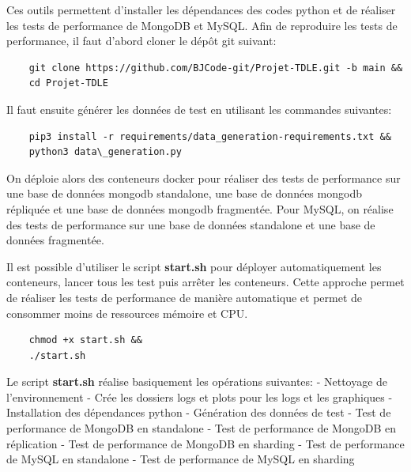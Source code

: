 \documentclass[12pt,a4paper]{report}
\begin{document}
Ces outils permettent d'installer les dépendances des codes python et de
réaliser les tests de performance de MongoDB et MySQL. Afin de
reproduire les tests de performance, il faut d'abord cloner le dépôt git
suivant:

\begin{card}
    \begin{verbatim}
    git clone https://github.com/BJCode-git/Projet-TDLE.git -b main &&
    cd Projet-TDLE
\end{verbatim}
\end{card}

Il faut ensuite générer les données de test en utilisant les commandes
suivantes:

\begin{card}
    \begin{verbatim}
    pip3 install -r requirements/data_generation-requirements.txt &&
    python3 data\_generation.py
\end{verbatim}
\end{card}

On déploie alors des conteneurs docker pour réaliser des tests de
performance sur une base de données mongodb standalone, une base de
données mongodb répliquée et une base de données mongodb fragmentée.
Pour MySQL, on réalise des tests de performance sur une base de données
standalone et une base de données fragmentée.

Il est possible d'utiliser le script \textbf{start.sh} pour déployer
automatiquement les conteneurs, lancer tous les test puis arrêter les
conteneurs. Cette approche permet de réaliser les tests de performance
de manière automatique et permet de consommer moins de ressources
mémoire et CPU.

\begin{card}
    \begin{verbatim}
    chmod +x start.sh &&
    ./start.sh
\end{verbatim}
\end{card}

Le script \textbf{start.sh} réalise basiquement les opérations
suivantes: - Nettoyage de l'environnement - Crée les dossiers logs et
plots pour les logs et les graphiques - Installation des dépendances
python - Génération des données de test - Test de performance de MongoDB
en standalone - Test de performance de MongoDB en réplication - Test de
performance de MongoDB en sharding - Test de performance de MySQL en
standalone - Test de performance de MySQL en sharding
\end{document}
